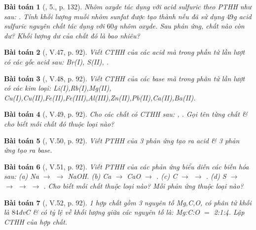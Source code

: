 \documentclass{article}
\newtheorem{baitoan}{Bài toán}
\begin{document}
\begin{baitoan}[\cite{SGK_Hoa_Hoc_8}, 5., p. 132]
	Nhôm oxyde tác dụng với acid sulfuric theo PTHH như sau: \emph{}. Tính khối lượng muối nhôm sunfat được tạo thành nếu đã sử dụng $49$\emph{g} acid sulfuric nguyên chất tác dụng với $60$\emph{g} nhôm oxyde. Sau phản ứng, chất nào còn dư? Khối lượng dư của chất đó là bao nhiêu?
\end{baitoan}

\begin{baitoan}[\cite{Truong_BTNC_Hoa_Hoc_8_2022}, V.47, p. 92]
	Viết CTHH của các acid mà trong phần tử lần lượt có các gốc acid sau: \emph{Br(I), S(II), }.
\end{baitoan}

\begin{baitoan}[\cite{Truong_BTNC_Hoa_Hoc_8_2022}, V.48, p. 92]
	Viết CTHH của các base mà trong phân tử lần lượt có các kim loại: \emph{Li(I),Rb(I),Mg(II), Cu(I),Cu(II),Fe(II),Fe(III),Al(III),Zn(II),Pb(II),Ca(II),Ba(II)}.
\end{baitoan}

\begin{baitoan}[\cite{Truong_BTNC_Hoa_Hoc_8_2022}, V.49, p. 92]
	Cho các chất có CTHH sau: \emph{, }. Gọi tên từng chất \& cho biết mỗi chất đó thuộc loại nào?
\end{baitoan}

\begin{baitoan}[\cite{Truong_BTNC_Hoa_Hoc_8_2022}, V.50, p. 92]
	Viết PTHH của 3 phản ứng tạo ra acid \& 3 phản ứng tạo ra base.
\end{baitoan}

\begin{baitoan}[\cite{Truong_BTNC_Hoa_Hoc_8_2022}, V.51, p. 92]
	Viết PTHH của các phản ứng biểu diễn các biến hóa sau: (a) \emph{Na $\to$  $\to$ NaOH}. (b) \emph{Ca $\to$ CaO $\to$ }. (c) \emph{C $\to$  $\to$ }. (d) \emph{S $\to$  $\to$  $\to$  $\to$ }. Cho biết mỗi chất thuộc loại nào? Mỗi phản ứng thuộc loại nào?
\end{baitoan}

\begin{baitoan}[\cite{Truong_BTNC_Hoa_Hoc_8_2022}, V.52, p. 92]
	1 hợp chất gồm 3 nguyên tố \emph{Mg,C,O}, có phân tử khối là $84$đvC \& có tỷ lệ về khối lượng giữa các nguyên tố là: \emph{Mg:C:O $=$ 2:1:4}. Lập CTHH của hợp chất.
\end{baitoan}
\end{document}
